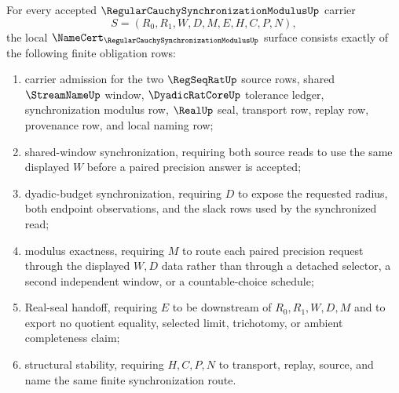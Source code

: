 \begin{theorem}
\label{thm:regular-cauchy-synchronization-modulus-namecert-obligations}
For every accepted $\RegularCauchySynchronizationModulusUp$ carrier
$$
S=(R_0,R_1,W,D,M,E,H,C,P,N),
$$
the local $\NameCert_{\RegularCauchySynchronizationModulusUp}$ surface consists exactly of the following finite obligation rows:
\begin{enumerate}
\item carrier admission for the two $\RegSeqRatUp$ source rows, shared $\StreamNameUp$ window, $\DyadicRatCoreUp$ tolerance ledger, synchronization modulus row, $\RealUp$ seal, transport row, replay row, provenance row, and local naming row;
\item shared-window synchronization, requiring both source reads to use the same displayed $W$ before a paired precision answer is accepted;
\item dyadic-budget synchronization, requiring $D$ to expose the requested radius, both endpoint observations, and the slack rows used by the synchronized read;
\item modulus exactness, requiring $M$ to route each paired precision request through the displayed $W,D$ data rather than through a detached selector, a second independent window, or a countable-choice schedule;
\item Real-seal handoff, requiring $E$ to be downstream of $R_0,R_1,W,D,M$ and to export no quotient equality, selected limit, trichotomy, or ambient completeness claim;
\item structural stability, requiring $H,C,P,N$ to transport, replay, source, and name the same finite synchronization route.
\end{enumerate}
\end{theorem}
